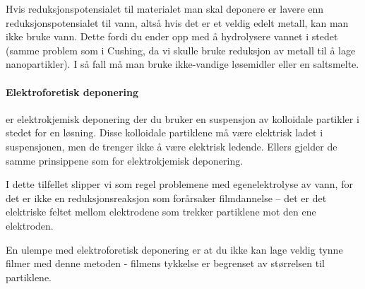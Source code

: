 Hvis reduksjonspotensialet til materialet man skal deponere er lavere enn reduksjonspotensialet til vann, altså hvis det er et veldig edelt metall, kan man ikke bruke vann. Dette fordi du ender opp med å hydrolysere vannet i stedet (samme problem som i Cushing, da vi skulle bruke reduksjon av metall til å lage nanopartikler). I så fall må man bruke ikke-vandige løsemidler eller en saltsmelte.

\paragraph{Elektroforetisk deponering} er elektrokjemisk deponering der du bruker en suspensjon av kolloidale partikler i stedet for en løsning. Disse kolloidale partiklene må være elektrisk ladet i suspensjonen, men de trenger ikke å være elektrisk ledende. Ellers gjelder de samme prinsippene som for elektrokjemisk deponering.

I dette tilfellet slipper vi som regel problemene med egenelektrolyse av vann, for det er ikke en reduksjonsreaksjon som forårsaker filmdannelse -- det er det elektriske feltet mellom elektrodene som trekker partiklene mot den ene elektroden.

En ulempe med elektroforetisk deponering er at du ikke kan lage veldig tynne filmer med denne metoden - filmens tykkelse er begrenset av størrelsen til partiklene.
